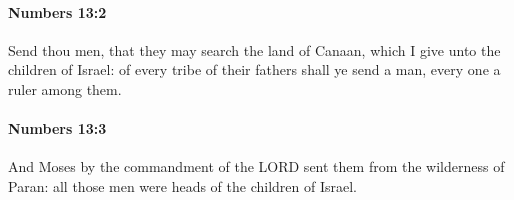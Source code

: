 		\paragraph{Numbers 13:2} %
			\label{NUMBERS-13-2}

			Send thou men, that they may search the land of Canaan, which I give unto the children of Israel: of every tribe of their fathers shall ye send a man, every one a ruler among them.


		\paragraph{Numbers 13:3} %
			\label{NUMBERS-13-3}

			And Moses by the commandment of the LORD sent them from the wilderness of Paran: all those men were heads of the children of Israel.


